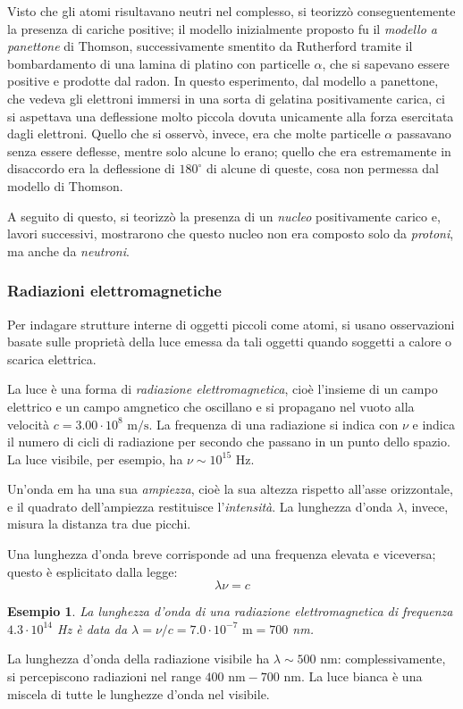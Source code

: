 \documentclass[11pt, a4paper]{scrartcl} %
\numberwithin{equation}{subsection}
\theoremstyle{style2}
\newtheorem{esempio}{Esempio}[section]
\theoremstyle{style1}
\begin{document}
Visto che gli atomi risultavano neutri nel complesso, si teorizz\`o conseguentemente la presenza di cariche positive; il modello inizialmente proposto fu il \textit{modello a panettone} di Thomson, successivamente smentito da Rutherford tramite il bombardamento di una lamina di platino con particelle $\alpha $, che si sapevano essere positive e prodotte dal radon.
In questo esperimento, dal modello a panettone, che vedeva gli elettroni immersi in una sorta di gelatina positivamente carica, ci si aspettava una deflessione molto piccola dovuta unicamente alla forza esercitata dagli elettroni.
Quello che si osserv\`o, invece, era che molte particelle $\alpha $ passavano senza essere deflesse, mentre solo alcune lo erano; quello che era estremamente in disaccordo era la deflessione di $180^\circ$ di alcune di queste, cosa non permessa dal modello di Thomson.

A seguito di questo, si teorizz\`o la presenza di un \textit{nucleo} positivamente carico e, lavori successivi, mostrarono che questo nucleo non era composto solo da \textit{protoni}, ma anche da \textit{neutroni}.
\subsubsection{Radiazioni elettromagnetiche}
Per indagare strutture interne di oggetti piccoli come atomi, si usano osservazioni basate sulle propriet\`a della luce emessa da tali oggetti quando soggetti a calore o scarica elettrica.

La luce \`e una forma di \textit{radiazione elettromagnetica}, cio\`e l'insieme di un campo elettrico e un campo amgnetico che oscillano e si propagano nel vuoto alla velocit\`a $c = 3.00 \cdot 10^8 \text{ m}/\text{s}$.
La frequenza di una radiazione si indica con $\nu $ e indica il numero di cicli di radiazione per secondo che passano in un punto dello spazio.
La luce visibile, per esempio, ha $\nu  \sim 10^{15} $ Hz.

Un'onda em ha una sua \textit{ampiezza}, cio\`e la sua altezza rispetto all'asse orizzontale, e il quadrato dell'ampiezza restituisce l'\textit{intensit\`a}.
La lunghezza d'onda $\lambda$, invece, misura la distanza tra due picchi.

Una lunghezza d'onda breve corrisponde ad una frequenza elevata e viceversa; questo \`e esplicitato dalla legge:
\begin{equation}
	\lambda \nu  = c
\end{equation}
\begin{esempio}
La lunghezza d'onda di una radiazione elettromagnetica di frequenza $4.3 \cdot  10^{14} $ Hz \`e data da $\lambda  = \nu  / c = 7.0 \cdot  10^{-7} \text{ m} = 700$ nm.
\end{esempio} 
La lunghezza d'onda della radiazione visibile ha $\lambda \sim 500$ nm: complessivamente, si percepiscono radiazioni nel range $400 \text{ nm} - 700 \text{ nm}$. La luce bianca \`e una miscela di tutte le lunghezze d'onda nel visibile.
\end{document}
